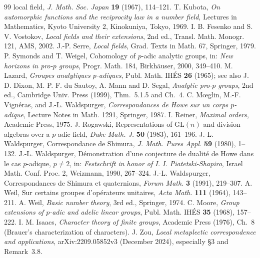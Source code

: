 \documentclass[11pt]{article}
\theoremstyle{plain}
\theoremstyle{definition}
\begin{document}
\begin{thebibliography}{99}
local field, \emph{J. Math. Soc. Japan} \textbf{19} (1967), 114--121.
 T. Kubota, \emph{On automorphic functions and the
reciprocity law in a number field}, Lectures in Mathematics, Kyoto
University 2, Kinokuniya, Tokyo, 1969.
 I. B. Fesenko and S. V. Vostokov, \emph{Local fields and
their extensions}, 2nd ed., Transl. Math. Monogr. 121, AMS, 2002.
 J.-P. Serre, \emph{Local fields}, Grad. Texts in Math.
67, Springer, 1979.
 P. Symonds and T. Weigel, Cohomology of $p$-adic analytic
groups, in: \emph{New horizons in pro-$p$ groups}, Progr. Math. 184,
Birkh\"auser, 2000, 349--410.
 M. Lazard, \emph{Groupes analytiques $p$-adiques},
Publ. Math. IH\'ES \textbf{26} (1965); see also J. D. Dixon, M. P. F. du
Sautoy, A. Mann and D. Segal, \emph{Analytic pro-$p$ groups}, 2nd ed.,
Cambridge Univ. Press (1999), Thm.~5.1.5 and Ch.~4.
 C. M\oe glin, M.-F. Vign\'eras, and J.-L. Waldspurger,
\emph{Correspondances de Howe sur un corps $p$-adique}, Lecture Notes
in Math. 1291, Springer, 1987.
 I. Reiner, \emph{Maximal orders}, Academic Press, 1975.
 J. Rogawski, Representations of $\mathrm{GL}(n)$ and
division algebras over a $p$-adic field, \emph{Duke Math. J.} \textbf{50}
(1983), 161--196.
 J.-L. Waldspurger, Correspondance de Shimura, \emph{J.
Math. Pures Appl.} \textbf{59} (1980), 1--132.
 J.-L. Waldspurger, D\'emonstration d'une conjecture de
dualit\'e de Howe dans le cas $p$-adique, $p\ne2$, in: \emph{Festschrift
in honor of I. I. Piatetski-Shapiro}, Israel Math. Conf. Proc. 2,
Weizmann, 1990, 267--324.
 J.-L. Waldspurger, Correspondances de Shimura et
quaternions, \emph{Forum Math.} \textbf{3} (1991), 219--307.
 A. Weil, Sur certains groupes d'op\'erateurs unitaires,
\emph{Acta Math.} \textbf{111} (1964), 143--211.
 A. Weil, \emph{Basic number theory}, 3rd ed., Springer, 1974.
 C. Moore, \emph{Group extensions of $p$-adic and adelic
linear groups}, Publ. Math. IH\'ES \textbf{35} (1968), 157--222.
 I. M. Isaacs, \emph{Character theory of finite groups},
Academic Press (1976), Ch.~8 (Brauer's characterization of characters).
 J. Zou,
\emph{Local metaplectic correspondence and applications},
arXiv:2209.05852v3 (December 2024), especially \S3 and Remark~3.8.
\end{thebibliography}
\end{document}
